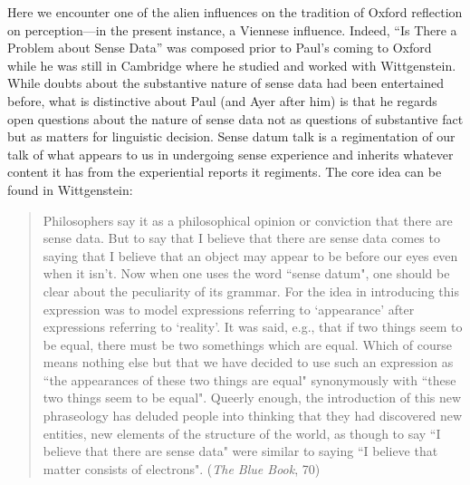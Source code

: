\documentclass[11pt]{article}
\begin{document}
Here we encounter one of the alien influences on the tradition of Oxford reflection on perception---in the present instance, a Viennese influence. Indeed, ``Is There a Problem about Sense Data'' was composed prior to Paul's coming to Oxford while he was still in Cambridge where he studied and worked with Wittgenstein. While doubts about the substantive nature of sense data had been entertained before, what is distinctive about Paul (and Ayer after him) is that he regards open questions about the nature of sense data not as questions of substantive fact but as matters for linguistic decision. Sense datum talk is a regimentation of our talk of what appears to us in undergoing sense experience and inherits whatever content it has from the experiential reports it regiments. The core idea can be found in Wittgenstein:
\begin{quote}
    Philosophers say it as a philosophical opinion or conviction that there are sense data. But to say that I believe that there are sense data comes to saying that I believe that an object may appear to be before our eyes even when it isn't. Now when one uses the word ``sense datum", one should be clear about the peculiarity of its grammar. For the idea in introducing this expression was to model expressions referring to `appearance' after expressions referring to `reality'. It was said, e.g., that if two things seem to be equal, there must be two somethings which are equal. Which of course means nothing else but that we have decided to use such an expression as ``the appearances of these two things are equal" synonymously with ``these two things seem to be equal". Queerly enough, the introduction of this new phraseology has deluded people into thinking that they had discovered new entities, new elements of the structure of the world, as though to say ``I believe that there are sense data" were similar to saying ``I believe that matter consists of electrons". (\emph{The Blue Book}, 70)
\end{quote}
\end{document}
